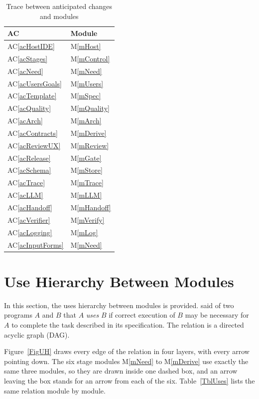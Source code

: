\documentclass[12pt, titlepage]{article}
\newcommand{\acref}[1]{AC\ref{#1}}
\newcommand{\mref}[1]{M\ref{#1}}
\begin{document}
\begin{table}[H]
\centering
\begin{tabular}{p{} p{}}
\toprule
\textbf{AC} & \textbf{Module}\\
\midrule
\acref{acHostIDE} & \mref{mHost}\\
\acref{acStages} & \mref{mControl}\\
\acref{acNeed} & \mref{mNeed}\\
\acref{acUsersGoals} & \mref{mUsers}\\
\acref{acTemplate} & \mref{mSpec}\\
\acref{acQuality} & \mref{mQuality}\\
\acref{acArch} & \mref{mArch}\\
\acref{acContracts} & \mref{mDerive}\\
\acref{acReviewUX} & \mref{mReview}\\
\acref{acRelease} & \mref{mGate}\\
\acref{acSchema} & \mref{mStore}\\
\acref{acTrace} & \mref{mTrace}\\
\acref{acLLM} & \mref{mLLM}\\
\acref{acHandoff} & \mref{mHandoff}\\
\acref{acVerifier} & \mref{mVerify}\\
\acref{acLogging} & \mref{mLog}\\
\acref{acInputForms} & \mref{mNeed}\\
\bottomrule
\end{tabular}
\caption{Trace between anticipated changes and modules}
\label{TblACT}
\end{table}

\section{Use Hierarchy Between Modules} \label{SecUse}

In this section, the uses hierarchy between modules is provided.
\citet{Parnas1978} said of two programs $A$ and $B$ that $A$ {\em uses} $B$ if
correct execution of $B$ may be necessary for $A$ to complete the task described
in its specification. The relation is a directed acyclic graph (DAG).

Figure~\ref{FigUH} draws every edge of the relation in four layers, with every
arrow pointing down. The six stage modules \mref{mNeed} to \mref{mDerive} use
exactly the same three modules, so they are drawn inside one dashed box, and an
arrow leaving the box stands for an arrow from each of the six.
Table~\ref{TblUses} lists the same relation module by module.
\end{document}
